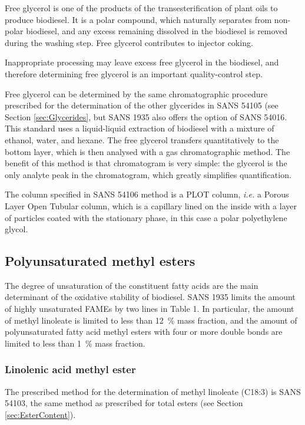 Free glycerol is one of the products of the transesterification of plant oils to
produce biodiesel. It is a polar compound, which naturally separates from
non-polar biodiesel, and any excess remaining dissolved in the biodiesel is
removed during the washing step. Free glycerol contributes to injector coking. 

Inappropriate processing may leave excess free glycerol in the biodiesel, and
therefore determining free glycerol is an important quality-control step.

Free glycerol can be determined by the same chromatographic procedure prescribed
for the determination of the other glycerides in SANS 54105 (see Section
\ref{sec:Glycerides}, but SANS 1935 also offers the option of SANS 54016. This
standard uses a liquid-liquid extraction of biodiesel with a mixture of ethanol,
water, and hexane. The free glycerol transfers quantitatively to the bottom
layer, which is then analysed with a gas chromatographic method. The benefit of
this method is that chromatogram is very simple: the glycerol is the only
analyte peak in the chromatogram, which greatly simplifies quantification.

The column specified in SANS 54106 method is a PLOT column, \textit{i.e.} a
Porous Layer Open Tubular column, which is a capillary lined on the inside with
a layer of particles coated with the stationary phase, in this case a polar
polyethylene glycol. 

\subsection{Polyunsaturated methyl esters}
\label{sec:ChromDetUnsat}

The degree of unsaturation of the constituent fatty acids are the main
determinant of the oxidative stability of biodiesel. SANS 1935 limits the amount
of highly unsaturated FAMEs by two lines in Table 1. In particular, the amount
of methyl linoleate is limited to less than \SI{12}{\percent} mass fraction, and
the amount of polyunsaturated fatty acid methyl esters with four or more double
bonds are limited to less than \SI{1}{\percent} mass fraction.

\subsubsection{Linolenic acid methyl ester}

The prescribed method for the determination of methyl linoleate (C18:3) is SANS
54103, the same method as prescribed for total esters (see Section
\ref{sec:EsterContent}).

